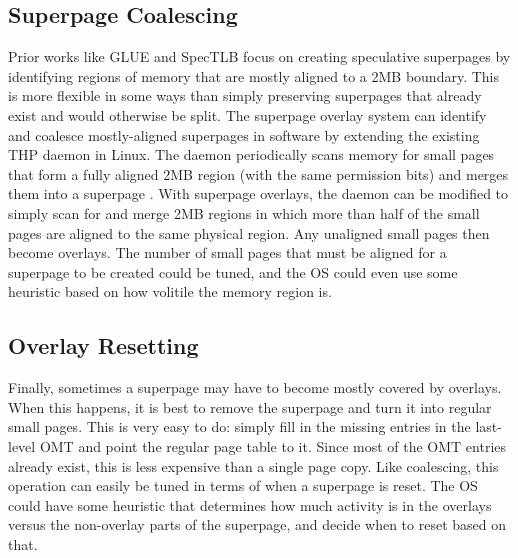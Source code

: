 \subsection{Superpage Coalescing}
Prior works like GLUE \cite{Pham} and SpecTLB \cite{Barr} focus on creating speculative superpages by identifying regions of memory that are mostly aligned to a 2MB boundary. This is more flexible in some ways than simply preserving superpages that already exist and would otherwise be split. The superpage overlay system can identify and coalesce mostly-aligned superpages in software by extending the existing THP daemon in Linux. The daemon periodically scans memory for small pages that form a fully aligned 2MB region (with the same permission bits) and merges them into a superpage \cite{THP}. With superpage overlays, the daemon can be modified to simply scan for and merge 2MB regions in which more than half of the small pages are aligned to the same physical region. Any unaligned small pages then become overlays. The number of small pages that must be aligned for a superpage to be created could be tuned, and the OS could even use some heuristic based on how volitile the memory region is.

\subsection{Overlay Resetting}
Finally, sometimes a superpage may have to become mostly covered by overlays. When this happens, it is best to remove the superpage and turn it into regular small pages. This is very easy to do: simply fill in the missing entries in the last-level OMT and point the regular page table to it. Since most of the OMT entries already exist, this is less expensive than a single page copy. Like coalescing, this operation can easily be tuned in terms of when a superpage is reset. The OS could have some heuristic that determines how much activity is in the overlays versus the non-overlay parts of the superpage, and decide when to reset based on that.
